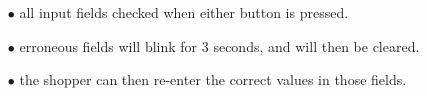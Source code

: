 \documentclass[pdf]{beamer}
\begin{document}
{\begin{frame}
\textcolor{myBlue}{\textbf{\footnotesize{\hspace{2mm}{Input checking}}}}
\begin{itemize}
\setlength{\itemindent}{0.5cm}
\setlength{\itemsep}{-0.5mm}
	\item[\textcolor{myBlue}{$\bullet$}]\textcolor{myBlue}{{\scriptsize all input fields checked when either button is pressed.}}
	\item[\textcolor{myBlue}{$\bullet$}]\textcolor{myBlue}{{\scriptsize erroneous fields will blink for 3 seconds, and will then be cleared.}}
	\item[\textcolor{myBlue}{$\bullet$}]\textcolor{myBlue}{{\scriptsize the shopper can then re-enter the correct values in those fields.}}
\end{itemize}
\end{frame}}
\end{document}
